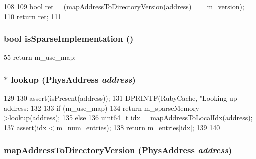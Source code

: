 \begin{DoxyCode}
108 {
109     bool ret = (mapAddressToDirectoryVersion(address) == m_version);
110     return ret;
111 }
\end{DoxyCode}
\hypertarget{classDirectoryMemory_aadd91d2a549668cda6508e49d0bc1bec}{
\subsubsection[{isSparseImplementation}]{\setlength{\rightskip}{0pt plus 5cm}bool isSparseImplementation ()}}
\label{classDirectoryMemory_aadd91d2a549668cda6508e49d0bc1bec}



\begin{DoxyCode}
55 { return m_use_map; }
\end{DoxyCode}
\hypertarget{classDirectoryMemory_aa41ffa1e9020bc6e333faf3c56a667f1}{
\subsubsection[{lookup}]{ $\ast$ lookup ({\bf PhysAddress} {\em address})}}
\label{classDirectoryMemory_aa41ffa1e9020bc6e333faf3c56a667f1}



\begin{DoxyCode}
129 {
130     assert(isPresent(address));
131     DPRINTF(RubyCache, "Looking up address: %
132 
133     if (m_use_map) {
134         return m_sparseMemory->lookup(address);
135     } else {
136         uint64_t idx = mapAddressToLocalIdx(address);
137         assert(idx < m_num_entries);
138         return m_entries[idx];
139     }
140 }
\end{DoxyCode}
\hypertarget{classDirectoryMemory_a9bae36eed835f1fd18280e5e438d4a00}{
\subsubsection[{mapAddressToDirectoryVersion}]{ mapAddressToDirectoryVersion ({\bf PhysAddress} {\em address})}}
\label{classDirectoryMemory_a9bae36eed835f1fd18280e5e438d4a00}



